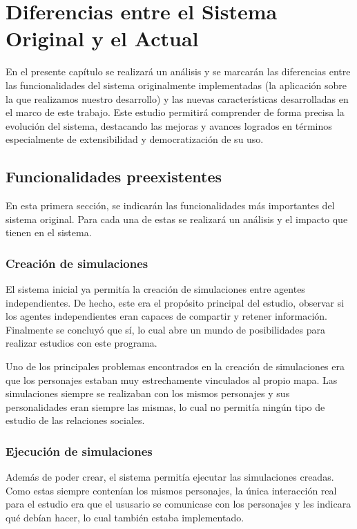 \chapter{Diferencias entre el Sistema Original y el Actual}
\label{cap:descripcionTrabajo}


En el presente capítulo se realizará un análisis y se marcarán las diferencias entre las funcionalidades del sistema originalmente implementadas (la aplicación sobre la que realizamos nuestro desarrollo) y las nuevas características desarrolladas en el marco de este trabajo. Este estudio permitirá comprender de forma precisa la evolución del sistema, destacando las mejoras y avances logrados en términos especialmente de extensibilidad y democratización de su uso.

\section{Funcionalidades preexistentes}

En esta primera sección, se indicarán las funcionalidades más importantes del sistema original. Para cada una de estas se realizará un análisis y el impacto que tienen en el sistema.

\subsection{Creación de simulaciones}
El sistema inicial ya permitía la creación de simulaciones entre agentes independientes. De hecho, este era el propósito principal del estudio, observar si los agentes independientes eran capaces de compartir y retener información. Finalmente se concluyó que sí, lo cual abre un mundo de posibilidades para realizar estudios con este programa.

Uno de los principales problemas encontrados en la creación de simulaciones era que los personajes estaban muy estrechamente vinculados al propio mapa. Las simulaciones siempre se realizaban con los mismos personajes y sus personalidades eran siempre las mismas, lo cual no permitía ningún tipo de estudio de las relaciones sociales.

\subsection{Ejecución de simulaciones}
Además de poder crear, el sistema permitía ejecutar las simulaciones creadas. Como estas siempre contenían los mismos personajes, la única interacción real para el estudio era que el ususario se comunicase con los personajes y les indicara qué debían hacer, lo cual también estaba implementado.

